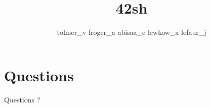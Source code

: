 \documentclass{beamer}
\title{42sh}
\author{
  tolmer\_v\newline
  froger\_a\newline
  abisaa\_e\newline
  lewkow\_a\newline
  lefaur\_j}
\date{}
\begin{document}
\begin{frame}
  \titlepage
\end{frame}

\begin{frame}
  \tableofcontents[pausesections ]
\end{frame}







\section{Questions}
\setcounter{subsection}{1}
\begin{frame}
  Questions ?
\end{frame}
\end{document}
